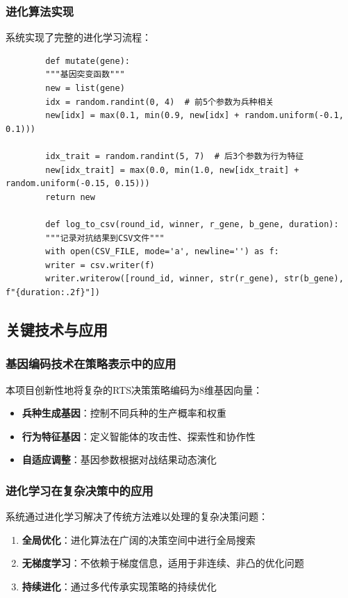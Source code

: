 \documentclass[12pt,a4paper]{article}
\begin{document}
	\subsubsection{进化算法实现}
	系统实现了完整的进化学习流程：
	
	\begin{verbatim}
		def mutate(gene):
		"""基因突变函数"""
		new = list(gene)
		idx = random.randint(0, 4)  # 前5个参数为兵种相关
		new[idx] = max(0.1, min(0.9, new[idx] + random.uniform(-0.1, 0.1)))
		
		idx_trait = random.randint(5, 7)  # 后3个参数为行为特征
		new[idx_trait] = max(0.0, min(1.0, new[idx_trait] + random.uniform(-0.15, 0.15)))
		return new
		
		def log_to_csv(round_id, winner, r_gene, b_gene, duration):
		"""记录对抗结果到CSV文件"""
		with open(CSV_FILE, mode='a', newline='') as f:
		writer = csv.writer(f)
		writer.writerow([round_id, winner, str(r_gene), str(b_gene), f"{duration:.2f}"])
	\end{verbatim}
	
	\subsection{关键技术与应用}
	\subsubsection{基因编码技术在策略表示中的应用}
	本项目创新性地将复杂的RTS决策策略编码为8维基因向量：
	\begin{itemize}
		\item \textbf{兵种生成基因}：控制不同兵种的生产概率和权重
		\item \textbf{行为特征基因}：定义智能体的攻击性、探索性和协作性
		\item \textbf{自适应调整}：基因参数根据对战结果动态演化
	\end{itemize}
	
	\subsubsection{进化学习在复杂决策中的应用}
	系统通过进化学习解决了传统方法难以处理的复杂决策问题：
	\begin{enumerate}
		\item \textbf{全局优化}：进化算法在广阔的决策空间中进行全局搜索
		\item \textbf{无梯度学习}：不依赖于梯度信息，适用于非连续、非凸的优化问题
		\item \textbf{持续进化}：通过多代传承实现策略的持续优化
	\end{enumerate}
	
\end{document}
